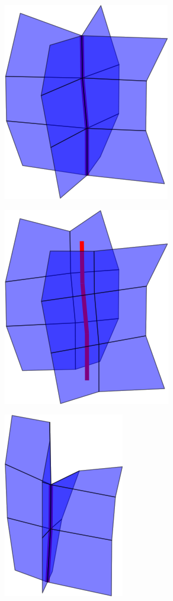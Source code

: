 \begin{figure}
\begin{center}
\begin{subfigure}[b]{.45\textwidth}
\end{subfigure}
\begin{subfigure}[b]{.45\textwidth}
\centering
\includegraphics[height = .17\textheight, width = .5\textwidth,keepaspectratio]{Pictures/SurfaceReconstruction/3DManifoldMM}
\end{subfigure}
\begin{subfigure}[b]{.45\textwidth}
\centering
\includegraphics[height = .17\textheight, width = .5\textwidth,keepaspectratio]{Pictures/SurfaceReconstruction/3DManifoldMMRes}
\end{subfigure}
\begin{subfigure}[b]{.45\textwidth}
\centering
\includegraphics[height = .17\textheight, width = .5\textwidth,keepaspectratio]{Pictures/SurfaceReconstruction/3DManifoldMI}

\end{subfigure}
\end{center}
\end{figure}
